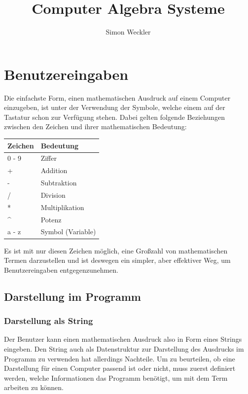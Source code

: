 \documentclass[11pt]{article}
\title{Computer Algebra Systeme}
\author{Simon Weckler}
\begin{document}
\maketitle
\tableofcontents

\section{Benutzereingaben}
Die einfachste Form, einen mathematischen Ausdruck auf einem Computer einzugeben, 
ist unter der Verwendung der Symbole, welche einem auf der Tastatur schon zur Verfügung stehen. 
Dabei gelten folgende Beziehungen zwischen den Zeichen und ihrer mathematischen Bedeutung:
\begin{table}[h]
\begin{tabular}{|l|l|}
\hline
  Zeichen               & Bedeutung         \\ \hline \hline
  0 - 9                 & Ziffer            \\ \hline
  +                     & Addition          \\ \hline
  -                     & Subtraktion        \\ \hline
  /                     & Division          \\ \hline
  *                     & Multiplikation    \\ \hline
  \textasciicircum      & Potenz            \\ \hline
  a - z                 & Symbol (Variable) \\ \hline
\end{tabular}
\end{table}

Es ist mit nur diesen Zeichen möglich, eine Großzahl von mathematischen Termen darzustellen 
und ist deswegen ein simpler, aber effektiver Weg, um Benutzereingaben entgegenzunehmen.

\subsection{Darstellung im Programm}
\subsubsection{Darstellung als String}

Der Benutzer kann einen mathematischen Ausdruck also in Form eines Strings eingeben. 
Den String auch als Datenstruktur zur Darstellung des Ausdrucks im Programm zu 
verwenden hat allerdings Nachteile. 
Um zu beurteilen, ob eine Darstellung für einen Computer passend ist oder nicht, 
muss zuerst definiert werden, welche Informationen das Programm benötigt,
um mit dem Term arbeiten zu können.
\end{document}
